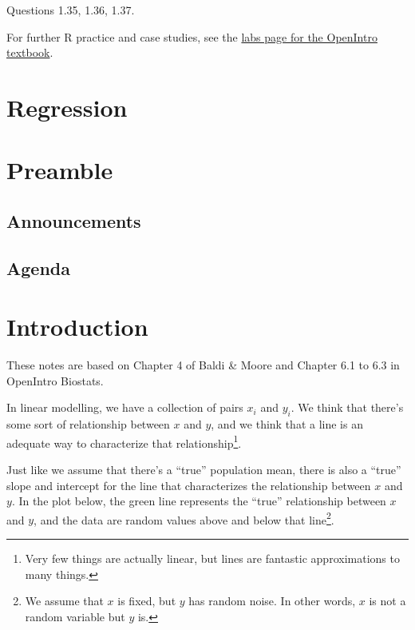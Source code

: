 \documentclass[
  letterpaper,
  DIV=11,
  numbers=noendperiod]{scrreprt}
\begin{document}
Questions 1.35, 1.36, 1.37.

For further R practice and case studies, see the
\href{https://www.openintro.org/book/statlabs/?labblock=biostat_intro_to_data}{labs
page for the OpenIntro textbook}.

\hypertarget{regression}{%
\chapter{Regression}\label{regression}}

\hypertarget{preamble-2}{%
\chapter{Preamble}\label{preamble-2}}

\hypertarget{announcements-3}{%
\section{Announcements}\label{announcements-3}}

\hypertarget{agenda-3}{%
\section{Agenda}\label{agenda-3}}

\hypertarget{introduction-1}{%
\chapter{Introduction}\label{introduction-1}}

These notes are based on Chapter 4 of Baldi \& Moore and Chapter 6.1 to
6.3 in OpenIntro Biostats.

In linear modelling, we have a collection of pairs \(x_i\) and \(y_i\).
We think that there's some sort of relationship between \(x\) and \(y\),
and we think that a line is an adequate way to characterize that
relationship\footnote{Very few things are actually linear, but lines are
  fantastic approximations to many things.}.

Just like we assume that there's a ``true'' population mean, there is
also a ``true'' slope and intercept for the line that characterizes the
relationship between \(x\) and \(y\). In the plot below, the green line
represents the ``true'' relationship between \(x\) and \(y\), and the
data are random values above and below that line\footnote{We assume that
  \(x\) is fixed, but \(y\) has random noise. In other words, \(x\) is
  not a random variable but \(y\) is.}.
\end{document}
